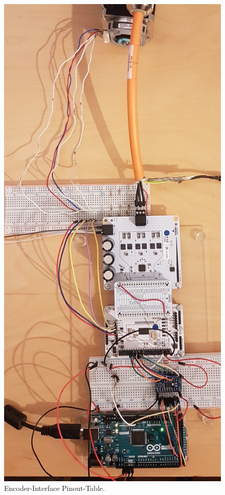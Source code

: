 \begin{appendix}
\newpage

\begin{figure}[h!]
	\centering
	\includegraphics[angle = 270, width=\textwidth]{graphics/4_komplett}
	\caption{Encoder-Interface Pinout-Table.}
	\label{fig:4_komplett}
\end{figure}


\end{appendix}
